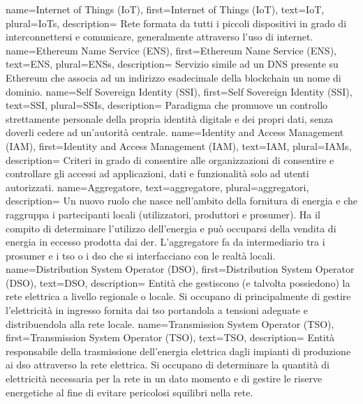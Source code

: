{
    name={Internet of Things (IoT)},
    first={Internet of Things (IoT)},
    text={IoT},
    plural={IoTs},
    description={
            Rete formata da tutti i piccoli dispositivi in grado di interconnettersi e comunicare,
            generalmente attraverso l'uso di internet.
        }
}
{
    name={Ethereum Name Service (ENS)},
    first={Ethereum Name Service (ENS)},
    text={ENS},
    plural={ENSs},
    description={
            Servizio simile ad un DNS presente su Ethereum che associa ad un indirizzo esadecimale della blockchain un nome di dominio.
        }
}
{
    name={Self Sovereign Identity (SSI)},
    first={Self Sovereign Identity (SSI)},
    text={SSI},
    plural={SSIs},
    description={
            Paradigma che promuove un controllo strettamente personale della propria identità digitale e dei propri dati,
            senza doverli cedere ad un'autorità centrale.
        }
}
{
    name={Identity and Access Management (IAM)},
    first={Identity and Access Management (IAM)},
    text={IAM},
    plural={IAMs},
    description={
            Criteri in grado di consentire alle organizzazioni di consentire e controllare gli accessi ad applicazioni,
            dati e funzionalità solo ad utenti autorizzati.
        }
}
{
    name={Aggregatore},
    text={aggregatore},
    plural={aggregatori},
    description={
            Un nuovo ruolo che nasce nell'ambito della fornitura di energia e che raggruppa i partecipanti locali (utilizzatori, produttori e \gls{prosumer}). Ha il compito di determinare l'utilizzo dell'energia e può occuparsi della vendita di energia in eccesso prodotta dai \gls{der}.
            L'aggregatore fa da intermediario tra i \gls{prosumer} e i \gls{tso} o i \gls{dso} che si interfacciano con le realtà locali.
        }
}
{
    name={Distribution System Operator (DSO)},
    first={Distribution System Operator (DSO)},
    text={DSO},
    description={
            Entità che gestiscono (e talvolta possiedono) la rete elettrica a livello regionale o locale.
            Si occupano di principalmente di gestire l'elettricità in ingresso fornita dai \gls{tso} portandola a tensioni adeguate e distribuendola alla rete locale.
        }
}
{
    name={Transmission System Operator (TSO)},
    first={Transmission System Operator (TSO)},
    text={TSO},
    description={
            Entità responsabile della trasmissione dell'energia elettrica dagli impianti di produzione ai \gls{dso} attraverso la rete elettrica.
            Si occupano di determinare la quantità di elettricità necessaria per la rete in un dato momento e di gestire le riserve energetiche al fine di evitare pericolosi squilibri nella rete.
        }
}
